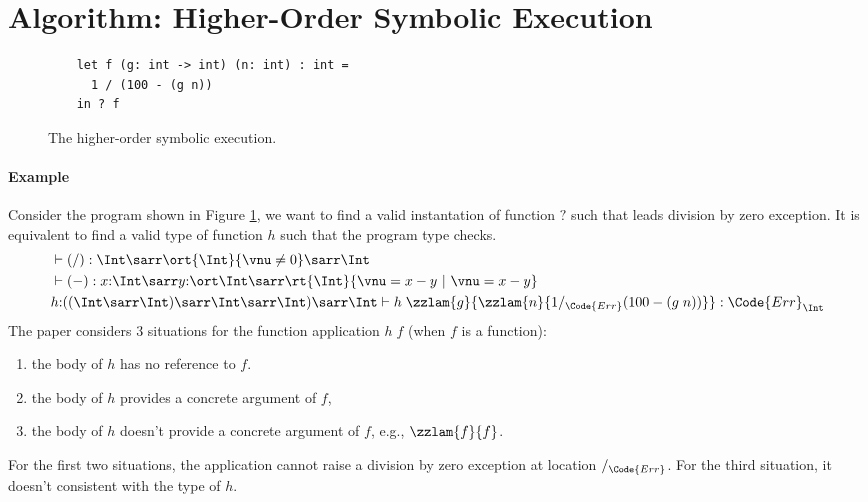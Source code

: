 \section{Algorithm: Higher-Order Symbolic Execution}

\begin{figure}[!t]
    \begin{verbatim}
    let f (g: int -> int) (n: int) : int =
      1 / (100 - (g n))
    in ? f
    \end{verbatim}
    \caption{The higher-order symbolic execution.}
    \label{fig:higher-order-symbolic-execution}
\end{figure}

\paragraph{Example} Consider the program shown in Figure \ref{fig:higher-order-symbolic-execution}, we want to find a valid instantation of function $?$ such that leads division by zero exception. It is equivalent to find a valid type of function $h$ such that the program type checks.
\begin{align*}
    &\vdash (/) : \Int \sarr \ort{\Int}{\vnu \neq 0} \sarr \Int
    \\&\vdash (-) : x{:}\Int \sarr y{:}\ort\Int \sarr \rt{\Int}{\vnu = x - y ~|~ \vnu = x - y}
    \\&h{:}((\Int\sarr\Int)\sarr\Int\sarr\Int)\sarr\Int \vdash h\; \zzlam{g}{\zzlam{n}{1 /_{\Code{Err}} (100 - (g\; n))}} : \Code{Err}_{\Int}
\end{align*}\noindent
The paper considers $3$ situations for the function application $h\;f$ (when $f$ is a function):
\begin{enumerate}
    \item the body of $h$ has no reference to $f$.
    \item the body of $h$ provides a concrete argument of $f$,
    \item the body of $h$ doesn't provide a concrete argument of $f$, e.g., $\zzlam{f}{f}$.
\end{enumerate}
For the first two situations, the application cannot raise a division by zero exception at location $/_{\Code{Err}}$. For the third situation, it doesn't consistent with the type of $h$.

